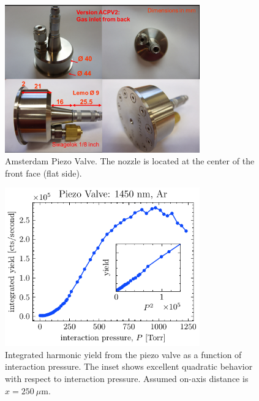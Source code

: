\begin{figure}
	\centering
	\includegraphics[width=0.75\textwidth]{figures/chap3/piezovalve_picture.png}
	\caption{Amsterdam Piezo Valve. The nozzle is located at the center of the front face (flat side).}
	\label{fig:piezovalve_picture}
\end{figure}

\begin{figure}
	\centering
	\includegraphics[width=0.75\textwidth]{figures/chap3/piezovalve_pscan.pdf}
	\caption{Integrated harmonic yield from the piezo valve as a function of interaction pressure. The inset shows excellent quadratic behavior with respect to interaction pressure. Assumed on-axis distance is $x = 250 \ \mu \textrm{m}$.}
	\label{fig:piezovalve_pscan}
\end{figure}

